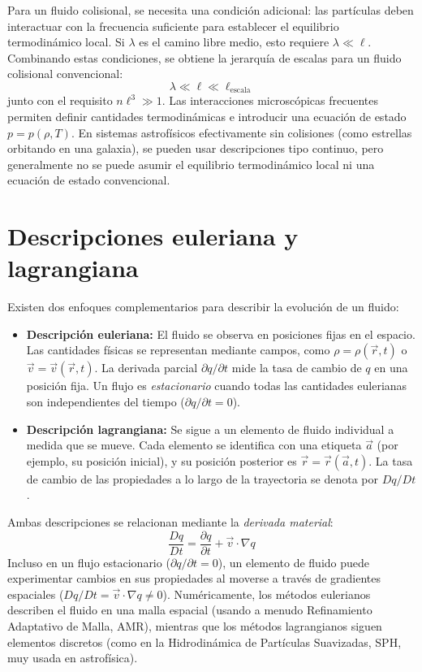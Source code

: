Para un fluido colisional, se necesita una condición adicional: las partículas deben interactuar con la frecuencia suficiente para establecer el equilibrio termodinámico local. Si $\lambda$ es el camino libre medio, esto requiere $\lambda \ll \ell$. Combinando estas condiciones, se obtiene la jerarquía de escalas para un fluido colisional convencional:
$$ \lambda \ll \ell \ll \ell_{\text{escala}} $$
junto con el requisito $n\ell^3 \gg 1$. Las interacciones microscópicas frecuentes permiten definir cantidades termodinámicas e introducir una ecuación de estado $p = p(\rho, T)$. En sistemas astrofísicos efectivamente sin colisiones (como estrellas orbitando en una galaxia), se pueden usar descripciones tipo continuo, pero generalmente no se puede asumir el equilibrio termodinámico local ni una ecuación de estado convencional.

\figuraElementoFluido

\section{Descripciones euleriana y lagrangiana}
Existen dos enfoques complementarios para describir la evolución de un fluido:

\begin{itemize}
    \item \textbf{Descripción euleriana:} El fluido se observa en posiciones fijas en el espacio. Las cantidades físicas se representan mediante campos, como $\rho = \rho(\vec{r}, t)$ o $\vec{v} = \vec{v}(\vec{r}, t)$. La derivada parcial $\partial q / \partial t$ mide la tasa de cambio de $q$ en una posición fija. Un flujo es \textit{estacionario} cuando todas las cantidades eulerianas son independientes del tiempo ($\partial q / \partial t = 0$).
    \item \textbf{Descripción lagrangiana:} Se sigue a un elemento de fluido individual a medida que se mueve. Cada elemento se identifica con una etiqueta $\vec{a}$ (por ejemplo, su posición inicial), y su posición posterior es $\vec{r} = \vec{r}(\vec{a}, t)$. La tasa de cambio de las propiedades a lo largo de la trayectoria se denota por $Dq/Dt$.
\end{itemize}

Ambas descripciones se relacionan mediante la \textit{derivada material}:
$$ \frac{Dq}{Dt} = \frac{\partial q}{\partial t} + \vec{v} \cdot \nabla q $$
Incluso en un flujo estacionario ($\partial q / \partial t = 0$), un elemento de fluido puede experimentar cambios en sus propiedades al moverse a través de gradientes espaciales ($Dq/Dt = \vec{v} \cdot \nabla q \neq 0$). Numéricamente, los métodos eulerianos describen el fluido en una malla espacial (usando a menudo Refinamiento Adaptativo de Malla, AMR), mientras que los métodos lagrangianos siguen elementos discretos (como en la Hidrodinámica de Partículas Suavizadas, SPH, muy usada en astrofísica).


